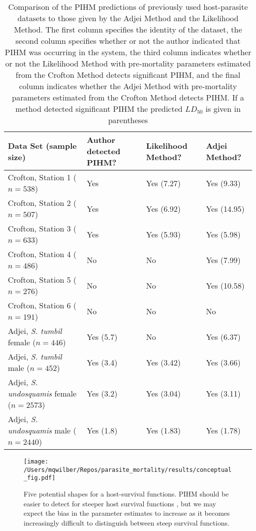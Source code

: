 \documentclass[12pt, a4paper]{article}
\begin{document}
\renewcommand{\arraystretch}{1.2}
\begin{sidewaystable}

    \caption{Comparison of the PIHM predictions of previously used host-parasite datasets to those given by the Adjei Method and the Likelihood Method. The first column specifies the identity of the dataset, the second column specifies whether or not the author indicated that PIHM was occurring in the system, the third column indicates whether or not the Likelihood Method with pre-mortality parameters estimated from the Crofton Method detects significant PIHM, and the final column indicates whether the Adjei Method with pre-mortality parameters estimated from the Crofton Method detects PIHM.  If a method detected significant PIHM the predicted $LD_{50}$ is given in parentheses}

    \centering
    \begin{tabular}{l  p{3cm} p{3cm} l}

    \hline\hline
    Data Set (sample size) & Author detected PIHM? & Likelihood Method?  & Adjei Method? \\

    \hline
    Crofton, Station 1 ($n=538$) & Yes & Yes (7.27) & Yes (9.33) \\
    Crofton, Station 2 ($n=507$) & Yes & Yes (6.92) &  Yes (14.95)\\
    Crofton, Station 3 ($n=633$) & Yes & Yes (5.93) &  Yes (5.98) \\
    Crofton, Station 4 ($n=486$) & No & No &  Yes (7.99) \\
    Crofton, Station 5 ($n=276$) & No & No & Yes (10.58) \\
    Crofton, Station 6 ($n=191$) & No & No & No \\
    Adjei, \emph{S. tumbil} female ($n=446$) & Yes (5.7) & No & Yes (6.37) \\
    Adjei, \emph{S. tumbil} male ($n=452$) & Yes (3.4) & Yes (3.42) & Yes (3.66)  \\
    Adjei, \emph{S. undosquamis} female ($n=2573$) & Yes (3.2) & Yes (3.04) & Yes (3.11) \\
    Adjei, \emph{S. undosquamis} male ($n=2440$) & Yes (1.8) & Yes (1.83) & Yes (1.78) \\


    \end{tabular}
    \label{table:pihm}

\end{sidewaystable}

\begin{figure}
    \texttt{[image: /Users/mqwilber/Repos/parasite\_mortality/results/conceptual\_fig.pdf]}

    \caption{Five potential shapes for a host-survival functions. PIHM should be easier to detect for steeper host survival functions \citep{Lanciani1989}, but we may expect the bias in the parameter estimates to increase as it becomes increasingly difficult to distinguish between steep survival functions.}
    \label{fig:surv}
\end{figure}
\end{document}
